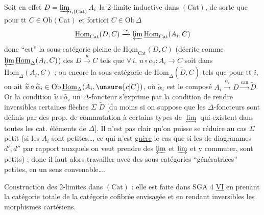 Soit en effet $D=\varinjlim_{i,(\mathrm{Cat})}A_i$ la 2-limite inductive dans $(\mathrm{Cat})$, de sorte que pour tt $C\in\mathrm{Ob}(\mathrm{Cat})$ et  fortiori $C\in\mathrm{Ob}\,\Delta$
\[
\underline{\mathrm{Hom}}_{\mathrm{Cat}}(D,C)\xrightarrow{\simeq}\varprojlim\underline{\mathrm{Hom}}_{\mathrm{Cat}}(A_i,C)
\]
donc  ``est'' la sous-catégorie pleine de  $\underline{\mathrm{Hom}}_{\mathrm{Cat}}(D,C)$  (décrite comme $\varprojlim\underline{\mathrm{Hom}}_{\Delta}(A_i,C)$) des $D\xrightarrow{u}C$  tels que $\forall\,i$, $u\circ\alpha_i:A_i\to C$ soit dans $\underline{\mathrm{Hom}}_{\Delta}(A_i,C)$ ;  ou encore la sous-catégorie de $\underline{\mathrm{Hom}}_{\Delta}(\widetilde D,C)$  tels que pour tt $i$, on ait $\widetilde u\circ\widetilde\alpha_i\in\mathrm{Ob}\,\underline{\mathrm{Hom}}_{\Delta}(A_i,\unsure{c|C})$\unsure{\})|)\}}, où $\widetilde\alpha_i$ est le composé $A_i\xrightarrow{\alpha_i}D\xrightarrow{\mathrm{can}}\widetilde D$. Or la condition
$\widetilde u\circ\widetilde{\alpha_i}$ un $\Delta$-foncteur s'exprime par la condition de rendre inversibles certaines flèches $\Sigma$  $\widetilde D$ [du moins si on suppose que les $\Delta$-foncteurs sont définis par des prop. de commutation à certains types de $\underset{\leftrightarrow}{\lim}$ qui existent dans toutes les cat. éléments de $\Delta$]. Il n'est pas clair qu'on puisse se réduire au cas $\Sigma$ petit (si les $A_i$  sont petites\ldots, ce qui n'est \uline{guère} le cas que si les  de diagrammes $d',d''$ par rapport auxquels on veut prendre des $\varprojlim$ et $\varinjlim$ et y commuter, sont petits) ; donc il faut alors travailler avec des sous-catégories ``génératrices'' petites, en un sens convenable\ldots.

Construction des 2-limites dans $(\mathrm{Cat})$ : elle est faite dans SGA 4 \uline{VI} en prenant la catégorie totale de la catégorie cofibrée envisagée et en rendant inversibles les morphismes cartésiens.

